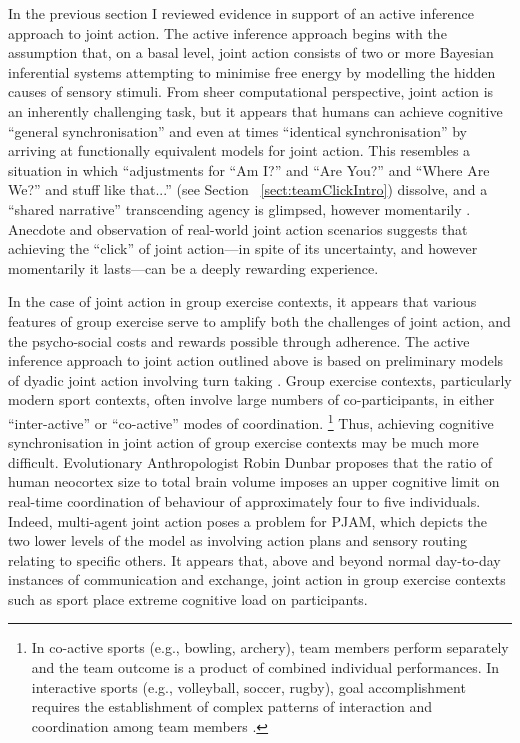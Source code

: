 \begin{CJK}{UTF8}{gbsn}
In the previous section I reviewed evidence in support of an active inference approach to joint action.  The active inference approach begins with the assumption that, on a basal level, joint action consists of two or more Bayesian inferential systems attempting to minimise free energy by modelling the hidden causes of sensory stimuli.  From sheer computational perspective, joint action is an inherently challenging task, but it appears that humans can achieve cognitive ``general synchronisation'' and even at times ``identical synchronisation'' by arriving at functionally equivalent models for joint action.  This resembles a situation in which ``adjustments for ``Am I?'' and ``Are You?'' and ``Where Are We?'' and stuff like that...'' (see Section ~\ref{sect:teamClickIntro}) dissolve, and a ``shared narrative'' transcending agency is glimpsed, however momentarily \citep{Friston2015}.  Anecdote and observation of real-world joint action scenarios suggests that achieving the ``click'' of joint action---in spite of its uncertainty, and however momentarily it lasts---can be a deeply rewarding experience.

In the case of joint action in group exercise contexts, it appears that various features of group exercise serve to amplify both the challenges of joint action, and the psycho-social costs and rewards possible through adherence.  The active inference approach to joint action outlined above is based on preliminary models of dyadic joint action involving turn taking \citep[i.e., in bird song exchanges][]{Friston2015}.  Group exercise contexts, particularly modern sport contexts, often involve large numbers of co-participants, in either ``inter-active'' or ``co-active'' modes of coordination.
    \footnote{
    In co-active sports (e.g., bowling, archery), team members perform separately and the team outcome is a product of combined individual performances. In interactive sports (e.g., volleyball, soccer, rugby), goal accomplishment requires the establishment of complex patterns of interaction and coordination among team members \citep{Filho2014}.
    }
Thus, achieving cognitive synchronisation in joint action of group exercise contexts may be much more difficult.  Evolutionary Anthropologist Robin Dunbar \textcite{Dunbar1992} proposes that the ratio of human neocortex size to total brain volume imposes an upper cognitive limit on real-time coordination of behaviour of approximately four to five individuals.  Indeed, multi-agent joint action poses a problem for PJAM, which depicts the two lower levels of the model as involving action plans and sensory routing relating to specific others. It appears that, above and beyond normal day-to-day instances of communication and exchange, joint action in group exercise contexts such as sport place extreme cognitive load on participants.


\end{CJK}
